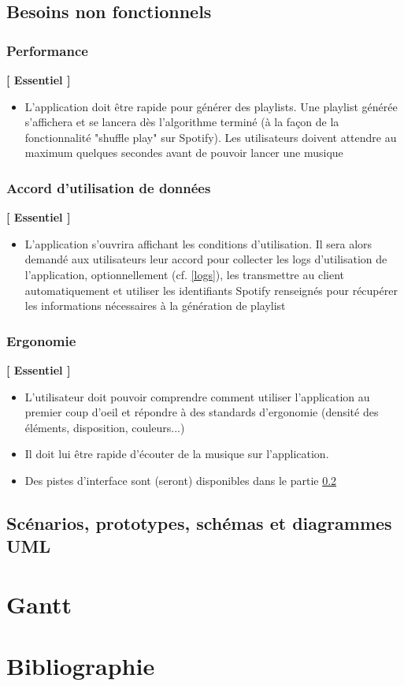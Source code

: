 \documentclass{article}
\begin{document}
		\subsection{Besoins non fonctionnels}
		  \subsubsection{Performance} \label{performance}
		  \textbf{[ Essentiel ]}
		  \begin{itemize}
		      \item L'application doit être rapide pour générer des playlists. Une playlist générée s'affichera et se lancera dès l'algorithme terminé (à la façon de la fonctionnalité "shuffle play" sur Spotify). Les utilisateurs doivent attendre au maximum quelques secondes avant de pouvoir lancer une musique
		  \end{itemize}
		    \subsubsection{Accord d'utilisation de données}
		    \textbf{[ Essentiel ]}
		    \begin{itemize}
		    \item L'application s'ouvrira affichant les conditions d'utilisation. Il sera alors demandé aux utilisateurs leur accord pour collecter les logs d'utilisation de l'application, optionnellement (cf. \ref{logs}), les transmettre au client automatiquement et utiliser les identifiants Spotify renseignés pour récupérer les informations nécessaires à la génération de playlist
		   \end{itemize}
		   \subsubsection{Ergonomie}
		   \textbf{[ Essentiel ]}
		   \begin{itemize}
		   \item L'utilisateur doit pouvoir comprendre comment utiliser l'application au premier coup d'oeil et répondre à des standards d'ergonomie (densité des éléments, disposition, couleurs...)
		   \item Il doit lui être rapide d'écouter de la musique sur l'application.
		   \item Des pistes d'interface sont (seront) disponibles dans le partie \ref{prototype}
		   \end{itemize}
		\subsection{Scénarios, prototypes, schémas et diagrammes UML} \label{prototype}
		\section{Gantt}
		\section{Bibliographie}
		
		
\end{document}
